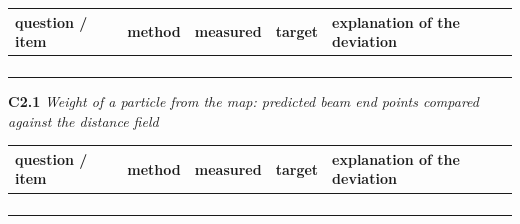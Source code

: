 \documentclass[a4paper,10pt]{article}
\begin{document}
\begin{tabular}{|>{\raggedright\hyphenpenalty 500\arraybackslash}p{2.87cm}|>{\raggedright\hyphenpenalty 500\arraybackslash}p{2.28cm}|>{\raggedright\hyphenpenalty 500\arraybackslash}p{2.87cm}|>{\raggedright\hyphenpenalty 500\arraybackslash}p{2.28cm}|>{\raggedright\hyphenpenalty 500\arraybackslash}p{3.70cm}|}
\hline
\textbf{question / item} & \textbf{method} & \textbf{measured} & \textbf{target} & \textbf{explanation of the deviation} \\
\hline
\rule{0pt}{2.4em} & \rule{0pt}{2.4em} & \rule{0pt}{2.4em} & \rule{0pt}{2.4em} & \rule{0pt}{2.4em} \\
\rule{0pt}{2.4em} & \rule{0pt}{2.4em} & \rule{0pt}{2.4em} & \rule{0pt}{2.4em} & \rule{0pt}{2.4em} \\
\rule{0pt}{2.4em} & \rule{0pt}{2.4em} & \rule{0pt}{2.4em} & \rule{0pt}{2.4em} & \rule{0pt}{2.4em} \\
\rule{0pt}{2.4em} & \rule{0pt}{2.4em} & \rule{0pt}{2.4em} & \rule{0pt}{2.4em} & \rule{0pt}{2.4em} \\
\hline
\end{tabular}

\vspace{4pt}\noindent\textbf{C2.1} \emph{Weight of a particle from the map: predicted beam end points compared against the distance field}

\begin{tabular}{|>{\raggedright\hyphenpenalty 500\arraybackslash}p{2.87cm}|>{\raggedright\hyphenpenalty 500\arraybackslash}p{2.28cm}|>{\raggedright\hyphenpenalty 500\arraybackslash}p{2.87cm}|>{\raggedright\hyphenpenalty 500\arraybackslash}p{2.28cm}|>{\raggedright\hyphenpenalty 500\arraybackslash}p{3.70cm}|}
\hline
\textbf{question / item} & \textbf{method} & \textbf{measured} & \textbf{target} & \textbf{explanation of the deviation} \\
\hline
\rule{0pt}{2.4em} & \rule{0pt}{2.4em} & \rule{0pt}{2.4em} & \rule{0pt}{2.4em} & \rule{0pt}{2.4em} \\
\rule{0pt}{2.4em} & \rule{0pt}{2.4em} & \rule{0pt}{2.4em} & \rule{0pt}{2.4em} & \rule{0pt}{2.4em} \\
\rule{0pt}{2.4em} & \rule{0pt}{2.4em} & \rule{0pt}{2.4em} & \rule{0pt}{2.4em} & \rule{0pt}{2.4em} \\
\rule{0pt}{2.4em} & \rule{0pt}{2.4em} & \rule{0pt}{2.4em} & \rule{0pt}{2.4em} & \rule{0pt}{2.4em} \\
\hline
\end{tabular}
\end{document}
